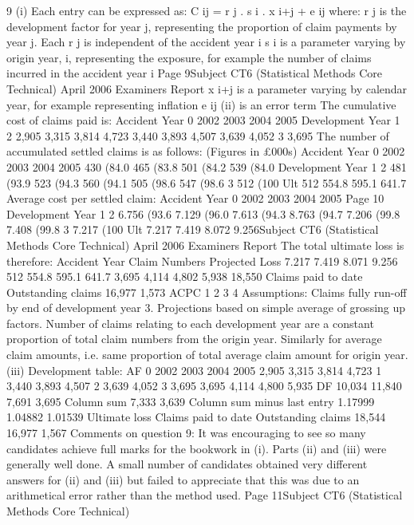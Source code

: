 9
(i)
Each entry can be expressed as:
C ij = r j . s i . x i+j + e ij
where:
r j is the development factor for year j, representing the proportion of claim
payments by year j. Each r j is independent of the accident year i
s i is a parameter varying by origin year, i, representing the exposure, for
example the number of claims incurred in the accident year i
Page 9Subject CT6 (Statistical Methods Core Technical)
April 2006
Examiners Report
x i+j is a parameter varying by calendar year, for example representing
inflation
e ij
(ii)
is an error term
The cumulative cost of claims paid is:
Accident
Year
0
2002
2003
2004
2005
Development Year
1
2
2,905
3,315
3,814
4,723
3,440
3,893
4,507
3,639
4,052
3
3,695
The number of accumulated settled claims is as follows:
(Figures in £000s)
Accident
Year
0
2002
2003
2004
2005
430 (84.0%
465 (83.8%
501 (84.2%
539 (84.0%
Development Year
1
2
481 (93.9%
523 (94.3%
560 (94.1%
505 (98.6%
547 (98.6%
3
512 (100%
Ult
512
554.8
595.1
641.7
Average cost per settled claim:
Accident
Year
0
2002
2003
2004
2005
Page 10
Development Year
1
2
6.756 (93.6%
7.129 (96.0%
7.613 (94.3%
8.763 (94.7%
7.206 (99.8%
7.408 (99.8%
3
7.217 (100%
Ult
7.217
7.419
8.072
9.256Subject CT6 (Statistical Methods Core Technical)
April 2006
Examiners Report
The total ultimate loss is therefore:
Accident
Year
Claim
Numbers Projected
Loss
7.217
7.419
8.071
9.256 512
554.8
595.1
641.7 3,695
4,114
4,802
5,938
18,550
Claims paid to date
Outstanding claims 16,977
1,573
ACPC
1
2
3
4
Assumptions:
Claims fully run-off by end of development year 3.
Projections based on simple average of grossing up factors.
Number of claims relating to each development year are a constant proportion
of total claim numbers from the origin year.
Similarly for average claim amounts, i.e. same proportion of total average
claim amount for origin year.
(iii)
Development table:
AF
0
2002
2003
2004
2005
2,905
3,315
3,814
4,723
1
3,440
3,893
4,507
2
3,639
4,052
3
3,695
3,695
4,114
4,800
5,935
DF
10,034
11,840
7,691
3,695 Column sum
7,333
3,639
Column sum minus last entry
1.17999 1.04882 1.01539
Ultimate loss
Claims paid to date
Outstanding claims
18,544
16,977
1,567
Comments on question 9: It was encouraging to see so many candidates achieve full marks
for the bookwork in (i). Parts (ii) and (iii) were generally well done. A small number of
candidates obtained very different answers for (ii) and (iii) but failed to appreciate that this
was due to an arithmetical error rather than the method used.
Page 11Subject CT6 (Statistical Methods Core Technical)
